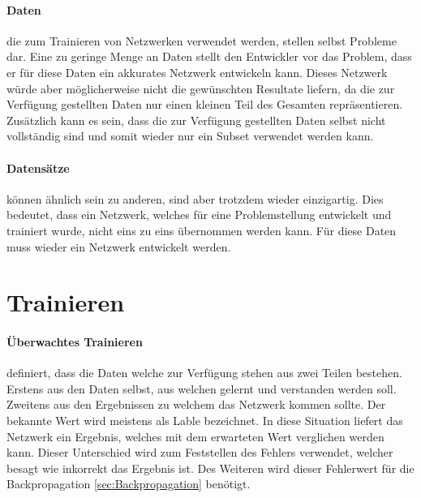
\paragraph{Daten} die zum Trainieren von Netzwerken verwendet werden, stellen selbst Probleme dar.
Eine zu geringe Menge an Daten stellt den Entwickler vor das Problem, dass er für diese Daten ein akkurates Netzwerk entwickeln kann.
Dieses Netzwerk würde aber möglicherweise nicht die gewünschten Resultate liefern, da die zur Verfügung gestellten Daten nur einen kleinen Teil des Gesamten repräsentieren.
Zusätzlich kann es sein, dass die zur Verfügung gestellten Daten selbst nicht vollständig sind und somit wieder nur ein Subset verwendet werden kann.

\paragraph{Datensätze} können ähnlich sein zu anderen, sind aber trotzdem wieder einzigartig. 
Dies bedeutet, dass ein Netzwerk, welches für eine Problemstellung entwickelt und trainiert wurde, nicht eins zu eins übernommen werden kann.
Für diese Daten muss wieder ein Netzwerk entwickelt werden.

\section{Trainieren}

\paragraph{Überwachtes Trainieren} definiert, dass die Daten welche zur Verfügung stehen aus zwei Teilen bestehen.
Erstens aus den Daten selbst, aus welchen gelernt und verstanden werden soll.
Zweitens aus den Ergebnissen zu welchem das Netzwerk kommen sollte.
Der bekannte Wert wird meistens als Lable bezeichnet. 
In diese Situation liefert das Netzwerk ein Ergebnis, welches mit dem erwarteten Wert verglichen werden kann.
Dieser Unterschied wird zum Feststellen des Fehlers verwendet, welcher besagt wie inkorrekt das Ergebnis ist.
Des Weiteren wird dieser Fehlerwert für die Backpropagation \ref{sec:Backpropagation} benötigt.


